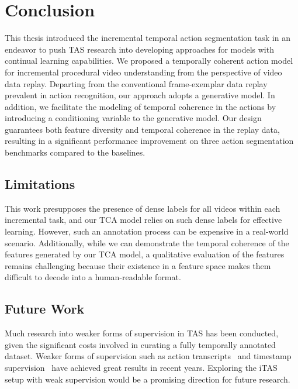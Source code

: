 \chapter{Conclusion}
\label{ch:conc}

This thesis introduced the incremental temporal action segmentation task in an endeavor to push TAS research into developing approaches for models with continual learning capabilities. We proposed a temporally coherent action model for incremental procedural video understanding from the perspective of video data replay. Departing from the conventional frame-exemplar data replay prevalent in action recognition, our approach adopts a generative model. In addition, we facilitate the modeling of temporal coherence in the actions by introducing a conditioning variable to the generative model. Our design guarantees both feature diversity and temporal coherence in the replay data, resulting in a significant performance improvement on three action segmentation benchmarks compared to the baselines. 

\section{Limitations}

This work presupposes the presence of dense labels for all videos within each incremental task, and our TCA model relies on such dense labels for effective learning. However, such an annotation process can be expensive in a real-world scenario. Additionally, while we can demonstrate the temporal coherence of the features generated by our TCA model, a qualitative evaluation of the features remains challenging because their existence in a feature space makes them difficult to decode into a human-readable format.

\section{Future Work}

Much research into weaker forms of supervision in TAS has been conducted, given the significant costs involved in curating a fully temporally annotated dataset. Weaker forms of supervision such as action transcripts~\cite{kuehne2017weakly} and timestamp supervision~\cite{li2021temporal,rahaman2022generalized} have achieved great results in recent years. Exploring the iTAS setup with weak supervision would be a promising direction for future research.



